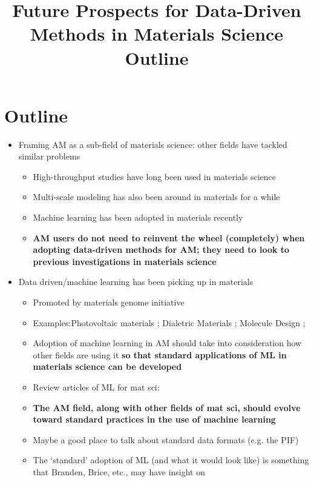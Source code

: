 \documentclass[notitlepage,nofootinbib]{revtex4-1}
\begin{document}
\title{Future Prospects for Data-Driven Methods in Materials Science \\ Outline}
\maketitle

\section{Outline}
\begin{itemize}
	\item Framing AM as a sub-field of materials science: other fields have tackled similar problems\begin{itemize}
		\item High-throughput studies have long been used in materials science \cite{Curtarolo}
		\item Multi-scale modeling has also been around in materials for a while \cite{ICME2013}
		\item Machine learning has been adopted in materials recently 
		\item \textbf{AM users do not need to reinvent the wheel (completely) when adopting data-driven methods for AM; they need to look to previous investigations in materials science}\end{itemize}
	
	\item Data driven/machine learning has been picking up in materials \begin{itemize}
		\item Promoted by materials genome initiative \cite{DePablo2014}
		\item Examples:Photovoltaic materials \cite{Olivares-Amaya}; Dialetric Materials \cite{Kim2016}; Molecule Design \cite{Butler2018}; \cite{Mannodi-Kanakkithodi2016} 
		\item Adoption of machine learning in AM should take into consideration how other fields are using it \textbf{so that standard applications of ML in materials science can be developed} 
		\item Review articles of ML for mat sci: \cite{Ramprasad2017, Kalidindi2016, Wagner2016, Jain2016}
		\item \textbf{The AM field, along with other fields of mat sci, should evolve toward standard practices in the use of machine learning}
		\item Maybe a good place to talk about standard data formats (e.g. the PIF)
		\item The `standard' adoption of ML (and what it would look like) is something that Branden, Brice, etc., may have insight on
		\end{itemize}
	

\end{itemize}
\end{document}
